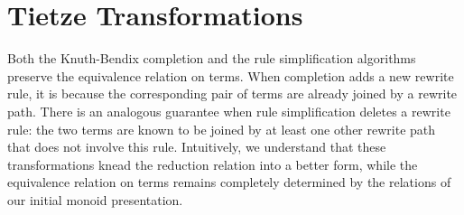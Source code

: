 \documentclass[../generics]{subfiles}
\begin{document}
\section{Tietze Transformations}\label{tietze transformations}

Both the Knuth-Bendix completion and the rule simplification algorithms preserve the equivalence relation on terms. When completion adds a new rewrite rule, it is because the corresponding pair of terms are already joined by a rewrite path. There is an analogous guarantee when rule simplification deletes a rewrite rule: the two terms are known to be joined by at least one other rewrite path that does not involve this rule. Intuitively, we understand that these transformations knead the reduction relation into a better form, while the equivalence relation on terms remains completely determined by the relations of our initial monoid presentation.
\end{document}

